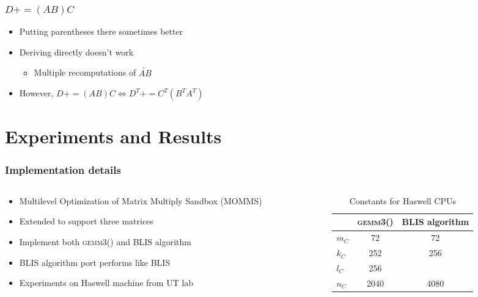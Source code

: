 \documentclass{beamer}
\newcommand*{\pluseq}{\mathrel{{+}{=}}}
\newcommand*{\gemmt}{{\textsc{gemm3()}}}
\begin{document}
\begin{frame}
  \frametitle{$D \pluseq (AB)C$}
  \begin{itemize}
  \item Putting parentheses there sometimes better
  \item Deriving directly doesn't work
    \begin{itemize}
    \item Multiple recomputations of $\tilde{AB}$
    \end{itemize}
  \item However, $D \pluseq (AB)C \Leftrightarrow D^T \pluseq C^T(B^TA^T)$
  \end{itemize}
\end{frame}

\section[Results]{Experiments and Results}
\begin{frame}
  \frametitle{Implementation details}
  \begin{columns}
    \begin{column}{0.5\textwidth}
      \begin{itemize}
      \item Multilevel Optimization of Matrix Multiply Sandbox (MOMMS)
      \item Extended to support three matrices
      \item Implement both \gemmt{} and BLIS algorithm
      \item BLIS algorithm port performs like BLIS
      \item Experiments on Haswell machine from UT lab
      \end{itemize}
    \end{column}
    \begin{column}{0.5\textwidth}
      \begin{table}
        \centering
        \begin{tabular}{l|c c}
          &\gemmt{}&BLIS algorithm\\ \hline
          $m_C$&72&72\\
          $k_C$&252&256\\
          $l_C$&256&\\
          $n_C$&2040&4080\\
        \end{tabular}
        \caption{Constants for Haswell CPUs}
        \label{tab:haswell-consts}
      \end{table}
    \end{column}
  \end{columns}
\end{frame}
\end{document}
